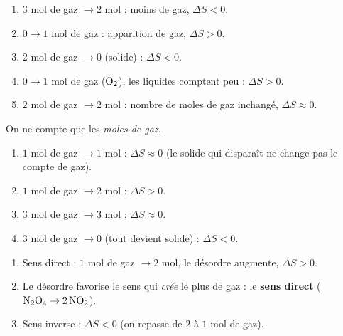 \documentclass[11pt,a4paper]{article}
\newcommand{\dS}{\Delta S}
\newcommand{\rep}[1]{\textcolor{primarydark}{\textbf{#1}}}
\begin{document}
\begin{center}
\end{center}

\begin{correction}
\begin{enumerate}[label=\alph*),leftmargin=2em,topsep=2pt,itemsep=2pt]
  \item $3$ mol de gaz $\to 2$ mol : moins de gaz, \rep{$\dS<0$}.
  \item $0 \to 1$ mol de gaz : apparition de gaz, \rep{$\dS>0$}.
  \item $2$ mol de gaz $\to 0$ (solide) : \rep{$\dS<0$}.
  \item $0 \to 1$ mol de gaz ($\ce{O2}$), les liquides comptent peu : \rep{$\dS>0$}.
  \item $2$ mol de gaz $\to 2$ mol : nombre de moles de gaz inchangé, \rep{$\dS\approx0$}.
\end{enumerate}
\end{correction}

\begin{correction}
On ne compte que les \emph{moles de gaz}.
\begin{enumerate}[label=\alph*),leftmargin=2em,topsep=2pt,itemsep=2pt]
  \item $1$ mol de gaz $\to 1$ mol : \rep{$\dS\approx0$} (le solide qui disparaît ne change pas le compte de gaz).
  \item $1$ mol de gaz $\to 2$ mol : \rep{$\dS>0$}.
  \item $3$ mol de gaz $\to 3$ mol : \rep{$\dS\approx0$}.
  \item $3$ mol de gaz $\to 0$ (tout devient solide) : \rep{$\dS<0$}.
\end{enumerate}
\end{correction}

\begin{correction}
\begin{enumerate}[label=\alph*),leftmargin=2em,topsep=2pt,itemsep=2pt]
  \item Sens direct : $1$ mol de gaz $\to 2$ mol, le désordre augmente, \rep{$\dS>0$}.
  \item Le désordre favorise le sens qui \emph{crée} le plus de gaz : le \rep{sens direct}
        ($\ce{N2O4}\to2\,\ce{NO2}$).
  \item Sens inverse : \rep{$\dS<0$} (on repasse de $2$ à $1$ mol de gaz).
\end{enumerate}
\end{correction}
\end{document}
